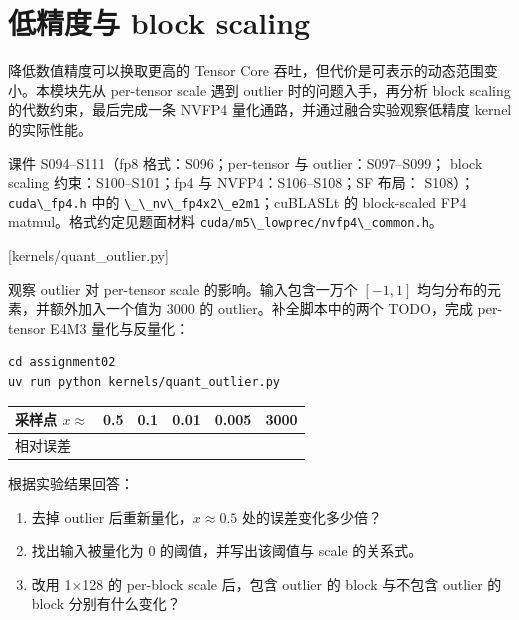 \documentclass[11pt,a4paper,fontset=none]{ctexart}
\providecommand{\passthrough}[1]{#1}
\begin{document}
\hypertarget{ux4f4eux7cbeux5ea6ux4e0e-block-scaling}{%
\section{低精度与 block
scaling}\label{ux4f4eux7cbeux5ea6ux4e0e-block-scaling}}

降低数值精度可以换取更高的 Tensor Core
吞吐，但代价是可表示的动态范围变小。本模块先从 per-tensor scale 遇到
outlier 时的问题入手，再分析 block scaling 的代数约束，最后完成一条
NVFP4 量化通路，并通过融合实验观察低精度 kernel 的实际性能。

\begin{reading}

课件 S094--S111（fp8 格式：S096；per-tensor 与 outlier：S097--S099；
block scaling 约束：S100--S101；fp4 与 NVFP4：S106--S108；SF 布局：
S108）；\passthrough{\lstinline!cuda\_fp4.h!} 中的
\passthrough{\lstinline!\_\_nv\_fp4x2\_e2m1!}；cuBLASLt 的 block-scaled
FP4 matmul。格式约定见题面材料
\passthrough{\lstinline!cuda/m5\_lowprec/nvfp4\_common.h!}。

\end{reading}

[kernels/quant\_outlier.py]

观察 outlier 对 per-tensor scale 的影响。输入包含一万个 \([-1,1]\)
均匀分布的元素，并额外加入一个值为 3000 的 outlier。补全脚本中的两个
TODO，完成 per-tensor E4M3 量化与反量化：

\begin{lstlisting}
cd assignment02
uv run python kernels/quant_outlier.py
\end{lstlisting}

\begin{longtable}[]{@{}llllll@{}}
\toprule\noalign{}
采样点 \(x\approx\) & 0.5 & 0.1 & 0.01 & 0.005 & 3000 \\
\midrule\noalign{}
\endhead
\bottomrule\noalign{}
\endlastfoot
相对误差 & & & & & \\
\end{longtable}

根据实验结果回答：

\begin{enumerate}
\def\labelenumi{(\alph{enumi})}
\item
  去掉 outlier 后重新量化，\(x\approx0.5\) 处的误差变化多少倍？
\item
  找出输入被量化为 0 的阈值，并写出该阈值与 scale 的关系式。
\item
  改用 1×128 的 per-block scale 后，包含 outlier 的 block 与不包含
  outlier 的 block 分别有什么变化？
\end{enumerate}
\end{document}
